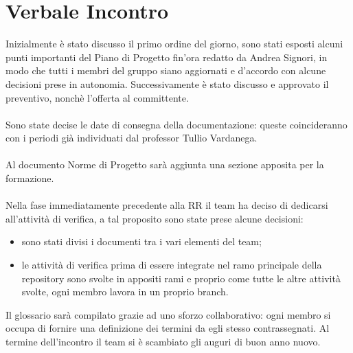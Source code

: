 \section{Verbale Incontro}
    Inizialmente è stato discusso il primo ordine del giorno, sono stati esposti alcuni punti importanti del Piano di Progetto fin'ora redatto da Andrea Signori, in modo che tutti i membri del gruppo siano aggiornati e d'accordo con alcune decisioni prese in autonomia. Successivamente è stato discusso e approvato il preventivo, nonchè l'offerta al committente.
    \\\\
    \noindent Sono state decise le date di consegna della documentazione: queste coincideranno con i periodi già individuati dal professor Tullio Vardanega.
    \\\\
    \noindent Al documento Norme di Progetto sarà aggiunta una sezione apposita per la formazione.
    \\\\
    \noindent Nella fase immediatamente precedente alla RR il team ha deciso di dedicarsi all'attività di verifica, a tal proposito sono state prese alcune decisioni:
    \begin{itemize}
        \item sono stati divisi i documenti tra i vari elementi del team;
        \item le attività di verifica prima di essere integrate nel ramo principale della repository sono svolte in appositi rami e proprio come tutte le altre attività svolte, ogni membro lavora in un proprio branch.
    \end{itemize}
    Il glossario sarà compilato grazie ad uno sforzo collaborativo: ogni membro si occupa di fornire una definizione dei termini da egli stesso contrassegnati.
    Al termine dell'incontro il team si è scambiato gli auguri di buon anno nuovo.